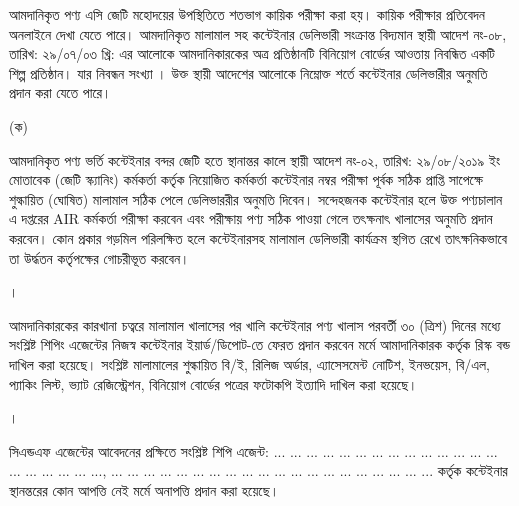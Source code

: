 \documentclass[12pt]{article}
\newcommand{\impreg}{\eireg}
\newcommand{\san}{... ... ... ... ... ... ... ... ... ... ... ... ... ... ... ... ... ... ... ...}
\newcommand{\sad}{... ... ... ... ... ... ... ... ... ... ... ... ... ... ... ... ... ... ... ...}
\begin{document}
\footnotesize
\begin{minipage}[t]{0.96\linewidth}
আমদানিকৃত পণ্য
এসি জেটি মহোদয়ের উপস্থিতিতে
শতভাগ কায়িক পরীক্ষা করা হয়।
কায়িক পরীক্ষার প্রতিবেদন অনলাইনে দেখা যেতে পারে।
আমদানিকৃত মালামাল সহ কন্টেইনার ডেলিভারী
সংক্রান্ত বিদ্যমান স্থায়ী আদেশ নং-০৮,
তারিখ: ২৯/০৭/০৩ খ্রি: এর আলোকে
আমদানিকারকের অত্র প্রতিষ্ঠানটি বিনিয়োগ
বোর্ডের আওতায় নিবন্ধিত একটি শিল্প
প্রতিষ্ঠান। যার নিবন্ধন সংখ্যা {\impreg}।
উক্ত স্থায়ী আদেশের আলোকে
নিম্নোক্ত শর্তে কন্টেইনার ডেলিভারীর
অনুমতি প্রদান করা যেতে পারে।
\\
\begin{minipage}[t]{0.04\linewidth}
(ক)
\end{minipage}
\begin{minipage}[t]{0.92\linewidth}
আমদানিকৃত পণ্য ভর্তি
কন্টেইনার বন্দর জেটি
হতে স্থানান্তর কালে স্থায়ী
আদেশ নং-০২, তারিখ: ২৯/০৮/২০১৯ ইং
মোতাবেক (জেটি স্ক্যানিং)
কর্মকর্তা কর্তৃক
নিয়োজিত কর্মকর্তা
কন্টেইনার
নম্বর পরীক্ষা পূর্বক
সঠিক প্রাপ্তি সাপেক্ষে
শুল্কায়িত (ঘোষিত) মালামাল সঠিক পেলে
ডেলিভাররীর অনুমতি
দিবেন। সন্দেহজনক কন্টেইনার হলে
উক্ত পণ্যচালান এ দপ্তরের AIR কর্মকর্তা
পরীক্ষা করবেন এবং পরীক্ষায় পণ্য সঠিক পাওয়া গেলে
তৎক্ষনাৎ খালাসের অনুমতি প্রদান করবেন।
কোন প্রকার গড়মিল পরিলক্ষিত হলে
কন্টেইনারসহ মালামাল ডেলিভারী কার্যক্রম স্থগিত রেখে
তাৎক্ষনিকভাবে তা উর্দ্ধতন কর্তৃপক্ষের গোচরীভূত করবেন।
\\
\end{minipage}
\end{minipage}
\begin{minipage}[t]{0.04\linewidth}
।
\end{minipage}
\begin{minipage}[t]{0.96\linewidth}
আমদানিকারকের কারখানা চত্বরে মালামাল
খালাসের পর খালি কন্টেইনার পণ্য খালাস
পরবর্তী ৩০ (ত্রিশ) দিনের মধ্যে
সংশ্লিষ্ট শিপিং এজেন্টের নিজস্ব কন্টেইনার
ইয়ার্ড/ডিপোট-তে ফেরত প্রদান করবেন
মর্মে আমাদানিকারক কর্তৃক রিস্ক বন্ড দাখিল
করা হয়েছে।
সংশ্লিষ্ট মালামালের শুল্কায়িত বি/ই,
রিলিজ অর্ডার, এ্যাসেসমেন্ট নোটিশ,
ইনভয়েস, বি/এল, প্যাকিং লিস্ট,
ভ্যাট রেজিস্ট্রেশন, বিনিয়োগ বোর্ডের
পত্রের ফটোকপি ইত্যাদি দাখিল করা হয়েছে।
\\
\end{minipage}
\begin{minipage}[t]{0.04\linewidth}
।
\end{minipage}
\begin{minipage}[t]{0.96\linewidth}
সিএন্ডএফ এজেন্টের আবেদনের প্রক্ষিতে
সংশ্লিষ্ট শিপি এজেন্ট:
{\san}, {\sad}
কর্তৃক কন্টেইনার স্থানন্তরের কোন আপত্তি নেই
মর্মে অনাপত্তি প্রদান করা হয়েছে।
\\
\end{minipage}
\end{document}
